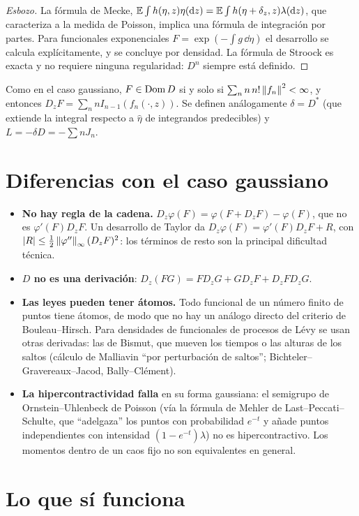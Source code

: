 \begin{proof}[Esbozo]
La fórmula de Mecke, $\mathbb{E}\int h(\eta,z)\eta(\mathrm{d} z)=\mathbb{E}\int h(\eta+\delta_z,z)\lambda(\mathrm{d} z)$, que caracteriza a la
medida de Poisson, implica una fórmula de integración por partes. Para funcionales exponenciales
$F=\exp(-\int g\,\dd\eta)$ el desarrollo se calcula explícitamente, y se concluye por densidad. La fórmula
de Stroock es exacta y no requiere ninguna regularidad: $D^n$ siempre está definido.
\end{proof}

Como en el caso gaussiano, $F\in\operatorname{Dom} D$ si y solo si $\sum_nn\,n!\left\lVert f_n\right\rVert^2<\infty$, y entonces
$D_zF=\sum_nnI_{n-1}(f_n(\cdot,z))$. Se definen análogamente $\delta=D^*$ (que extiende la integral respecto
a $\hat\eta$ de integrandos predecibles) y $L=-\delta D=-\sum nJ_n$.

\section{Diferencias con el caso gaussiano}
\begin{itemize}
  \item \textbf{No hay regla de la cadena.} $D_z\varphi(F)=\varphi(F+D_zF)-\varphi(F)$, que no es $\varphi'(F)D_zF$.
  Un desarrollo de Taylor da $D_z\varphi(F)=\varphi'(F)D_zF+R$, con $\left\lvert R\right\rvert\le\frac12\left\lVert \varphi''\right\rVert_\infty(D_zF)^2$: los
  términos de resto son la principal dificultad técnica.
  \item \textbf{$D$ no es una derivación}: $D_z(FG)=FD_zG+GD_zF+D_zFD_zG$.
  \item \textbf{Las leyes pueden tener átomos.} Todo funcional de un número finito de puntos tiene
  átomos, de modo que no hay un análogo directo del criterio de Bouleau--Hirsch. Para
  densidades de funcionales de procesos de Lévy se usan otras derivadas: las de Bismut,
  que mueven los tiempos o las alturas de los saltos (cálculo de Malliavin ``por perturbación
  de saltos''; Bichteler--Gravereaux--Jacod, Bally--Clément).
  \item \textbf{La hipercontractividad falla} en su forma gaussiana: el semigrupo de Ornstein--Uhlenbeck
  de Poisson (vía la fórmula de Mehler de Last--Peccati--Schulte, que ``adelgaza''
  los puntos con probabilidad $e^{-t}$ y añade puntos independientes con intensidad $(1-e^{-t})\lambda$)
  no es hipercontractivo. Los momentos dentro de un caos fijo no son equivalentes en
  general.
\end{itemize}

\section{Lo que sí funciona}


